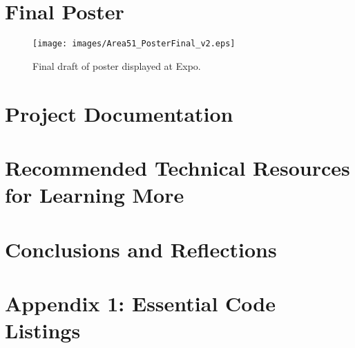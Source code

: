 \documentclass[letterpaper,10pt,serif,draftclsnofoot,onecolumn,compsoc,titlepage]{IEEEtran}
\begin{document}
		

	\newpage

\section{Final Poster}

	\begin{figure}[H]
		\centering
		\label{fig:ExpoPosterFinal_v2}
		\texttt{[image: images/Area51\_PosterFinal\_v2.eps]}
		\caption{Final draft of poster displayed at Expo. \label{overflow}}
	\end{figure}

\newpage

\section{Project Documentation}

\newpage

\section{Recommended Technical Resources for Learning More}

\newpage

\section{Conclusions and Reflections}


\newpage

\section{Appendix 1: Essential Code Listings}


\nocite{*}
\newpage


\end{document}
